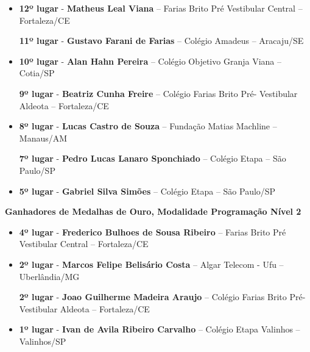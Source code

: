 \documentclass{article}
\begin{document}
\begin{itemize}
\item
\textbf{12º lugar} - \textbf{Matheus Leal Viana} – Farias Brito Pré Vestibular Central – Fortaleza/CE


\textbf{11º lugar} - \textbf{Gustavo Farani de Farias} – Colégio Amadeus – Aracaju/SE



\item
\textbf{10º lugar} - \textbf{Alan Hahn Pereira} – Colégio Objetivo Granja Viana – Cotia/SP


\textbf{9º lugar} - \textbf{Beatriz Cunha Freire} – Colégio Farias Brito Pré- Vestibular Aldeota – Fortaleza/CE



\item
\textbf{8º lugar} - \textbf{Lucas Castro de Souza} – Fundação Matias Machline – Manaus/AM


\textbf{7º lugar} - \textbf{Pedro Lucas Lanaro Sponchiado} – Colégio Etapa – São Paulo/SP



\item
\textbf{5º lugar} - \textbf{Gabriel Silva Simões} – Colégio Etapa – São Paulo/SP



\end{itemize}

\textbf{\color{blue}Ganhadores de Medalhas de Ouro, \color{black}Modalidade Programação Nível 2}
\color{black}

\begin{itemize}
\item
\textbf{4º lugar} - \textbf{Frederico Bulhoes de Sousa Ribeiro} – Farias Brito Pré Vestibular Central – Fortaleza/CE



\item
\textbf{2º lugar} - \textbf{Marcos Felipe Belisário Costa} – Algar Telecom - Ufu – Uberlândia/MG


\textbf{2º lugar} - \textbf{Joao Guilherme Madeira Araujo} – Colégio Farias Brito Pré- Vestibular Aldeota – Fortaleza/CE



\item
\textbf{1º lugar} - \textbf{Ivan de Avila Ribeiro Carvalho} – Colégio Etapa Valinhos – Valinhos/SP



\end{itemize}
\bigskip
\end{document}
